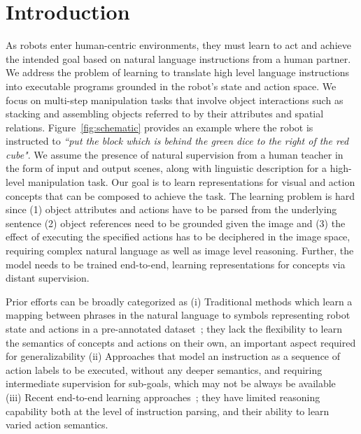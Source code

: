 \section{Introduction}
\label{sec:intro}
As robots enter human-centric environments, they must learn to act and achieve the intended goal based on natural language instructions from a human partner. 
%
We address the problem of learning to translate high level language instructions into
executable programs grounded in the robot’s state and action space. 
%
We focus on multi-step manipulation tasks that involve object interactions such as stacking and assembling objects referred to by their attributes and spatial relations. 
%
Figure~\ref{fig:schematic} provides an example where the robot is instructed to 
\emph{``put the block which is behind the green dice to the right of the red cube"}.  
%
We assume the presence of natural supervision from a human teacher in the form of 
input and output scenes, along with linguistic description for a high-level manipulation task. Our goal 
is to learn representations for visual and action concepts that can be composed to achieve the task. 
%
The learning problem is hard since (1) object attributes and actions have to be parsed from the underlying sentence (2) object references need to be grounded given the image and (3) the effect of executing the specified actions has to be deciphered in the image space, requiring complex natural language as well as image level reasoning. Further, the model needs to be trained end-to-end, learning representations for concepts via distant supervision.

Prior efforts can be broadly categorized as 
(i) Traditional methods which learn a mapping between phrases in the natural language to symbols representing robot state and actions in a pre-annotated dataset~\cite{howard2014natural,paul2016efficient,tellex2011approaching,matuszek2013learning,knepper2013ikeabot,gopalan2018sequence,williams2018learning}; they lack the flexibility to learn the semantics of concepts and actions on their own, an important aspect required for generalizability (ii) Approaches that model an instruction as a sequence of action labels to be executed, without any deeper semantics, and requiring intermediate supervision for sub-goals, which may not be always be available~\cite{paxton2019prospection,shah2018bayesian,wang2020learning,kress2008translating,lazaro2019beyond,tenorth2010understanding,lisca2015towards,misra2016tell} 
(iii) Recent end-to-end learning approaches~\cite{konidaris2018skills,wang2021learning, zettlemoyer2005learning,xia2018learning,silver2020few,zhu2021hierarchical,shridhar2022cliport,zeng2020transporter}; they have limited reasoning capability both at the level of instruction parsing, and their ability to learn varied action semantics.

